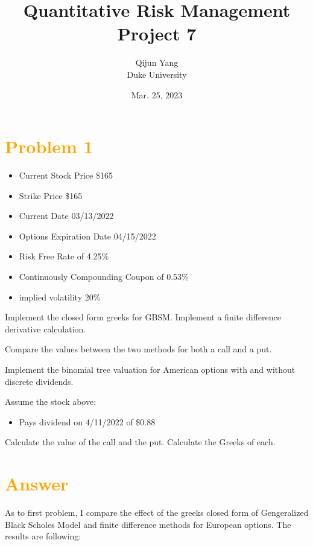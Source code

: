 \documentclass[11pt,en]{elegantpaper}
\title{Quantitative Risk Management Project 7}
\author{Qijun Yang \\ Duke University}
\institute{\href{https://fintech.meng.duke.edu}{Financial Technology at Duke University}}
\date{Mar. 25, 2023}
\begin{document}
\maketitle

\section*{\textcolor{orange}{Problem 1}}

\begin{itemize}
    \item Current Stock Price \$165
    \item Strike Price \$165
    \item Current Date 03/13/2022
    \item Options Expiration Date 04/15/2022
    \item Risk Free Rate of 4.25\%
    \item Continuously Compounding Coupon of 0.53\%
    \item implied volatility 20\%
\end{itemize}

Implement the closed form greeks for GBSM. Implement a finite difference derivative calculation.

Compare the values between the two methods for both a call and a put.

Implement the binomial tree valuation for American options with and without discrete dividends. 

Assume the stock above:

\begin{itemize}
    \item Pays dividend on 4/11/2022 of \$0.88
\end{itemize}

Calculate the value of the call and the put. Calculate the Greeks of each.


\section*{\textcolor{orange}{Answer}}

As to first problem, I compare the effect of the greeks closed form of Gengeralized Black Scholes Model and  finite difference methods for European options. The results are following:
\end{document}
